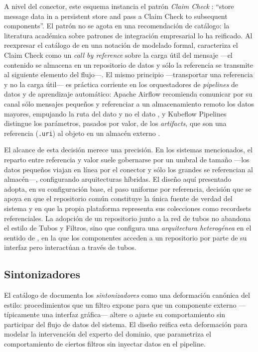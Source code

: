 \documentclass[12pt]{report}
\begin{document}
A nivel del conector, este esquema instancia el patrón \textit{Claim Check} \citep{hohpe:2003}: ``store message data in a persistent store and pass a Claim Check to subsequent components''. El patrón no se agota en una recomendación de catálogo: la literatura académica sobre patrones de integración empresarial lo ha reificado. Al reexpresar el catálogo de \citet{hohpe:2003} en una notación de modelado formal, \citet{ritter:2014} caracteriza el Claim Check como un \textit{call by reference} sobre la carga útil del mensaje ---el contenido se almacena en un repositorio de datos y sólo la referencia se transmite al siguiente elemento del flujo---. El mismo principio ---transportar una referencia y no la carga útil--- es práctica corriente en los orquestadores de \textit{pipelines} de datos y de aprendizaje automático: Apache Airflow recomienda comunicar por su canal sólo mensajes pequeños y referenciar a un almacenamiento remoto los datos mayores, empujando la ruta del dato y no el dato \citep{airflow-xcom}, y Kubeflow Pipelines distingue los parámetros, pasados por valor, de los \textit{artifacts}, que son una referencia (\texttt{.uri}) al objeto en un almacén externo \citep{kubeflow-artifacts}.

El alcance de esta decisión merece una precisión. En los sistemas mencionados, el reparto entre referencia y valor suele gobernarse por un umbral de tamaño ---los datos pequeños viajan en línea por el conector y sólo los grandes se referencian al almacén---, configurando arquitecturas híbridas. El diseño aquí presentado adopta, en su configuración base, el paso uniforme por referencia, decisión que se apoya en que el repositorio común constituye la única fuente de verdad del sistema y en que la propia plataforma representa sus colecciones como recordsets referenciales. La adopción de un repositorio junto a la red de tubos no abandona el estilo de Tubos y Filtros, sino que configura una \textit{arquitectura heterogénea} en el sentido de \citet{garlanshaw:1994}, en la que los componentes acceden a un repositorio por parte de su interfaz pero interactúan a través de tubos.

\subsection{Sintonizadores}
\label{sec:arq-car-sintonizadores}

El catálogo de \citet[\S3.13.2]{cristia:2025} documenta los \textit{sintonizadores} como una deformación canónica del estilo: procedimientos que un filtro expone para que un componente externo ---típicamente una interfaz gráfica--- altere o ajuste su comportamiento sin participar del flujo de datos del sistema. El diseño reifica esta deformación para modelar la intervención del experto del dominio, que parametriza el comportamiento de ciertos filtros sin inyectar datos en el pipeline.
\end{document}
